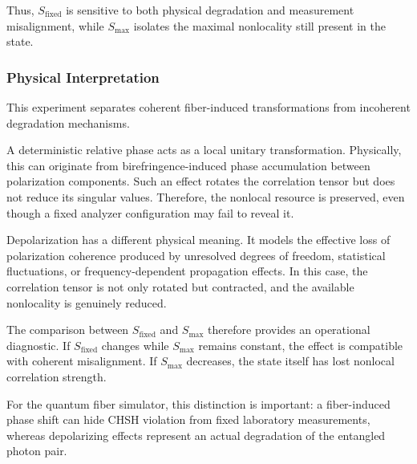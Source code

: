 \documentclass[a4paper]{article}
\begin{document}
\medskip

Thus, \( S_{\mathrm{fixed}} \) is sensitive to both physical degradation and measurement misalignment, while \( S_{\max} \) isolates the maximal nonlocality still present in the state.

\medskip


\subsubsection{Physical Interpretation}

This experiment separates coherent fiber-induced transformations from incoherent degradation mechanisms.

\medskip

A deterministic relative phase acts as a local unitary transformation. Physically, this can originate from birefringence-induced phase accumulation between polarization components. Such an effect rotates the correlation tensor but does not reduce its singular values. Therefore, the nonlocal resource is preserved, even though a fixed analyzer configuration may fail to reveal it.

\medskip

Depolarization has a different physical meaning. It models the effective loss of polarization coherence produced by unresolved degrees of freedom, statistical fluctuations, or frequency-dependent propagation effects. In this case, the correlation tensor is not only rotated but contracted, and the available nonlocality is genuinely reduced.

\medskip

The comparison between \( S_{\mathrm{fixed}} \) and \( S_{\max} \) therefore provides an operational diagnostic. If \( S_{\mathrm{fixed}} \) changes while \( S_{\max} \) remains constant, the effect is compatible with coherent misalignment. If \( S_{\max} \) decreases, the state itself has lost nonlocal correlation strength.

\medskip

For the quantum fiber simulator, this distinction is important: a fiber-induced phase shift can hide CHSH violation from fixed laboratory measurements, whereas depolarizing effects represent an actual degradation of the entangled photon pair.


\end{document}
